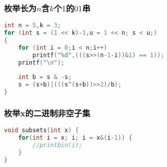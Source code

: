 	\subsubsection{枚举长为$n$含$k$个$1$的$01$串}
	\begin{lstlisting}[language=c++]
int n = 5,k = 3;
for (int s = (1 << k)-1,u = 1 << n; s < u;)
{
	for (int i = 0;i < n;i++)
		printf("%d",(((s>>(n-1-i))&1) == 1));
	printf("\n");
	
	int b = s & -s;
	s = (s+b)|(((s^(s+b))>>2)/b);
}
	\end{lstlisting}

	\subsubsection{枚举x的二进制非空子集}
	\begin{lstlisting}[language=c++]
void subsets(int x) {
    for(int i = x; i; i = x&(i-1)) {
        //printbin(i);
    }
}
    \end{lstlisting}


